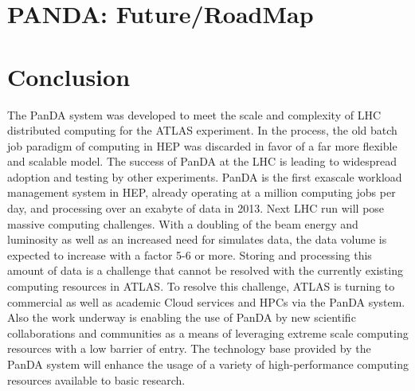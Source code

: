 \documentclass[10pt, conference, compsocconf]{IEEEtran}
\begin{document}
%

\section{PANDA: Future/RoadMap}
\label{sec:panda_roadmap}

 \section{Conclusion}\label{sec:conclusion}
The PanDA  system was developed to meet the scale and complexity of LHC distributed computing for the ATLAS experiment.  In the process,  the old batch job paradigm  of computing in HEP was  discarded  in favor of a  far more flexible and scalable  model. The success  of PanDA  at the LHC is leading to widespread adoption and testing by other experiments. PanDA  is the first exascale  workload management system in HEP, already operating at a million computing jobs per day, and processing over an exabyte of data in 2013. Next LHC run will pose massive computing  challenges. With a  doubling of the beam  energy  and luminosity as  well as an increased  need for  simulates  data, the data volume is expected to increase with a factor 5-6 or more. Storing and processing  this amount of data is a  challenge   that cannot be resolved with the currently existing  computing  resources in ATLAS. To resolve this challenge, ATLAS is turning to commercial  as well as academic Cloud services and HPCs via the PanDA system. Also the work underway is enabling the use of PanDA by new scientific collaborations and communities as a means  of leveraging  extreme scale computing  resources with a low barrier of entry. The technology base provided by the PanDA system will enhance the usage of a variety  of high-performance computing resources available to basic research.
\end{document}
